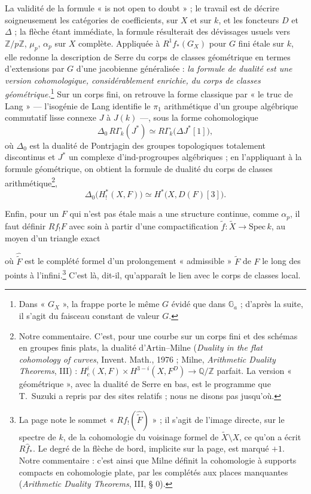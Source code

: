 \documentclass[11pt,a4paper]{article}
\begin{document}
La validité de la formule « is not open to doubt » ; le travail est de
décrire soigneusement les catégories de coefficients, sur $X$ et sur $k$, et
les foncteurs $D$ et $\Delta$ ; la flèche étant immédiate, la formule
résulterait des dévissages usuels vers $\mathbb{Z}/p\mathbb{Z}$, $\mu_p$,
$\alpha_p$ sur $X$ complète. Appliquée à $R^1f_*(G_X)$ pour $G$ fini étale
sur $k$, elle redonne la description de Serre du corps de classes
géométrique en termes d'extensions par $G$ d'une jacobienne généralisée :
\emph{la formule de dualité est une version cohomologique, considérablement
enrichie, du corps de classes géométrique.}\footnote{Dans « $G_X$ », la
frappe porte le même $G$ évidé que dans $\mathbb{G}_a$ ; d'après la suite, il
s'agit du faisceau constant de valeur $G$.} Sur un corps fini, on retrouve
la forme classique par « le truc de Lang » --- l'isogénie de Lang identifie
le $\pi_1$ arithmétique d'un groupe algébrique commutatif lisse connexe $J$
à $J(k)$ ---, sous la forme cohomologique
\[
\Delta_0\,R\Gamma_k(J^*) \simeq R\Gamma_k\bigl(\Delta J^*[1]\bigr),
\]
où $\Delta_0$ est la dualité de Pontrjagin des groupes topologiques totalement
discontinus et $J^*$ un complexe d'ind-progroupes algébriques ; en
l'appliquant à la formule géométrique, on obtient la formule de dualité du
corps de classes arithmétique\footnote{Notre commentaire. C'est, pour une courbe sur un corps fini et des
schémas en groupes finis plats, la dualité d'Artin--Milne
(\emph{Duality in the flat cohomology of curves}, Invent. Math., 1976 ;
Milne, \emph{Arithmetic Duality Theorems}, III) :
$H^i_c(X,F)\times H^{3-i}(X,F^D)\to\mathbb{Q}/\mathbb{Z}$ parfait. La
version « géométrique », avec la dualité de Serre en bas, est le programme
que T.~Suzuki a repris par des sites relatifs ; nous ne disons pas
jusqu'où.},
\[
\Delta_0\bigl(H^*_!(X,F)\bigr) \simeq H^*\bigl(X,D(F)[3]\bigr).
\]

Enfin, pour un $F$ qui n'est pas étale mais a une structure continue, comme
$\alpha_p$, il faut définir $Rf_!F$ avec soin à partir d'une
compactification $\tilde f : \tilde X \to \mathrm{Spec}\,k$, au moyen d'un
triangle exact


où $\hat{\tilde F}$ est le complété formel d'un prolongement
« admissible » $\tilde F$ de $F$ le long des points à
l'infini.\footnote{La page note le sommet « $Rf_!(\hat{\tilde F})$ » ; il
s'agit de l'image directe, sur le spectre de $k$, de la cohomologie du
voisinage formel de $\tilde X \setminus X$, ce qu'on a écrit
$R\hat f_*$. Le degré de la flèche de bord, implicite sur la page, est
marqué $+1$. Notre commentaire : c'est ainsi que Milne définit la
cohomologie à supports compacts en cohomologie plate, par les complétés aux
places manquantes (\emph{Arithmetic Duality Theorems}, III, § 0).} C'est là,
dit-il, qu'apparaît le lien avec le corps de classes local.
\end{document}
